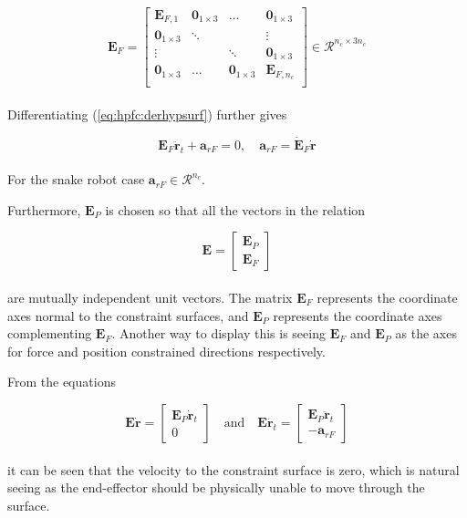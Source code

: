 \begin{equation}
    \mathbf{E}_F = 
    \begin{bmatrix}
        \mathbf{E}_{F,1} & \mathbf{0}_{1\times3} & \dots & \mathbf{0}_{1\times3} \\
        \mathbf{0}_{1\times3} & \ddots & & \vdots \\
        \vdots & & \ddots & \mathbf{0}_{1\times3} \\
        \mathbf{0}_{1\times3} & \dots & \mathbf{0}_{1\times3} & \mathbf{E}_{F,n_c} \\
    \end{bmatrix} \in \mathcal{R}^{n_c \times 3 n_c}
\end{equation}
\\

Differentiating (\ref{eq:hpfc:derhypsurf}) further gives

\begin{equation}\label{eq:dhpfc_arf}
    \mathbf{E}_F \mathbf{\ddot{r}}_t + \mathbf{a}_{r F} = 0, \quad \mathbf{a}_{r F} = \mathbf{\dot{E}}_F\mathbf{\dot{r}}
\end{equation}
\\
For the snake robot case $\mathbf{a}_{r F} \in \mathcal{R}^{n_c}$.

Furthermore, $\mathbf{E}_P$ is chosen so that all the vectors in the relation

\begin{equation}\label{eq:dhpfc_E}
    \mathbf{E} =
    \begin{bmatrix}
    \mathbf{E}_P \\ \mathbf{E}_F
    \end{bmatrix}
\end{equation}
\\
are mutually independent unit vectors. The matrix $\mathbf{E}_F$ represents the coordinate axes normal to the constraint surfaces, and $\mathbf{E}_P$ represents the coordinate axes complementing $\mathbf{E}_F$. Another way to display this is seeing $\mathbf{E}_F$ and $\mathbf{E}_P$ as the axes for force and position constrained directions respectively.

From the equations

\begin{equation}
    \mathbf{E\dot{r}} =
    \begin{bmatrix}
        \mathbf{E}_P \mathbf{\dot{r}}_t\\
        0
    \end{bmatrix}
    \quad \text{and} \quad
    \mathbf{E\ddot{r}}_t =
    \begin{bmatrix}
        \mathbf{E}_P \mathbf{\ddot{r}}_t \\
        -\mathbf{a}_{r F}
    \end{bmatrix}
\end{equation}
\\
it can be seen that the velocity to the constraint surface is zero, which is natural seeing as the end-effector should be physically unable to move through the surface.

